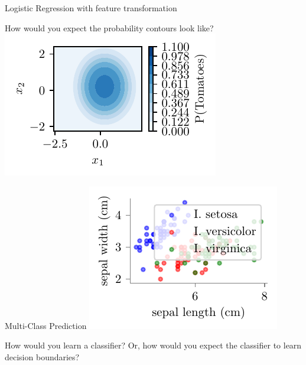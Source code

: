 \documentclass{beamer}
\begin{document}
\begin{frame}{Logistic Regression with feature transformation}

How would you expect the probability contours look like?
\pause \includegraphics{../assets/logistic-regression/figures/logisitic-circular-probability.pdf}


\end{frame}

\begin{frame}{Multi-Class Prediction}
\includegraphics{../assets/logistic-regression/figures/logisitic-iris.pdf}


\pause How would you learn a classifier? Or, how would you expect the classifier to learn decision boundaries?
\end{frame}
\end{document}
